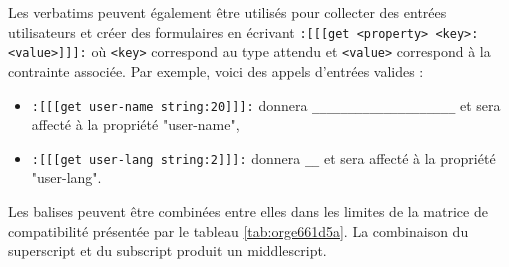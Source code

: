 \documentclass[a4paper,12pt]{article}
\begin{document}
Les verbatims peuvent également être utilisés pour collecter des entrées utilisateurs et créer des formulaires en écrivant \texttt{:[[[get <property> <key>:<value>]]]:} où \texttt{<key>} correspond au type attendu et \texttt{<value>} correspond à la contrainte associée. Par exemple, voici des appels d'entrées valides :
\begin{itemize}
\item \texttt{:[[[get user-name string:20]]]:} donnera \texttt{\_\_\_\_\_\_\_\_\_\_\_\_\_\_\_\_\_\_\_\_} et sera affecté à la propriété "user-name",
\item \texttt{:[[[get user-lang string:2]]]:} donnera \texttt{\_\_} et sera affecté à la propriété "user-lang".
\end{itemize}

Les balises peuvent être combinées entre elles dans les limites de la matrice de compatibilité présentée par le tableau \ref{tab:orge661d5a}. La combinaison du superscript et du subscript produit un middlescript.
\end{document}
